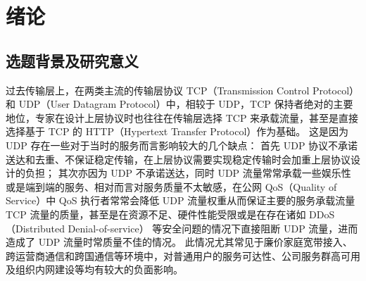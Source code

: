 

\chapter{绪论}

\section{选题背景及研究意义}

过去传输层上，在两类主流的传输层协议 TCP（Transmission Control Protocol）和 UDP（User Datagram Protocol）中，相较于 UDP，TCP 保持者绝对的主要地位，专家在设计上层协议时也往往在传输层选择 TCP 来承载流量，甚至是直接选择基于 TCP 的 HTTP（Hypertext Transfer Protocol）作为基础。
这是因为 UDP 存在一些对于当时的服务而言影响较大的几个缺点：
首先 UDP 协议不承诺送达和去重、不保证稳定传输\cite{rfc768}，在上层协议需要实现稳定传输时会加重上层协议设计的负担；
其次亦因为 UDP 不承诺送达，同时 UDP 流量常常承载一些娱乐性或是端到端的服务、相对而言对服务质量不太敏感\cite{5230775}，在公网 QoS（Quality of Service）中 QoS 执行者常常会降低 UDP 流量权重从而保证主要的服务承载流量 TCP 流量的质量，甚至是在资源不足、硬件性能受限或是在存在诸如 DDoS（Distributed Denial-of-service）\cite{WOS:000561707700021} 等安全问题的情况下直接阻断 UDP 流量，进而造成了 UDP 流量时常质量不佳的情况。
此情况尤其常见于廉价家庭宽带接入、跨运营商通信和跨国通信等环境中，对普通用户的服务可达性、公司服务群高可用及组织内网建设等均有较大的负面影响。

